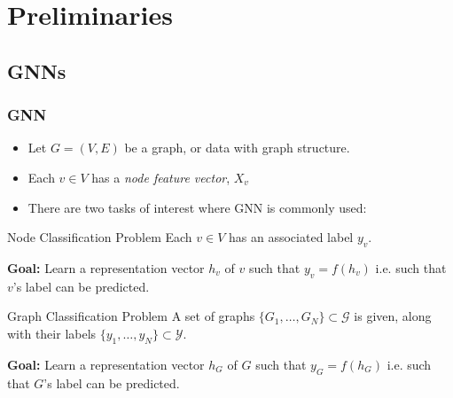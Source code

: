 \documentclass[handout]{beamer}
\begin{document}

\section{Preliminaries}


\subsection{GNNs}

\begin{frame}
\frametitle{GNN}

\begin{itemize}
	\item Let $G = (V, E)$ be a graph, or data with graph structure. \pause
	
	\item Each $v \in V$ has a {\it node feature vector}, $X_v$ \pause
	
	\item There are two tasks of interest where GNN is commonly used: \pause
\end{itemize}

\begin{block}{Node Classification Problem}
Each $v \in V$ has an associated label $y_v$.

{\bf Goal:} Learn a representation vector $h_v$ of $v$ such that $y_v = f(h_v)$ i.e. such that $v$'s label can be predicted. 
\end{block} \pause

\begin{block}{Graph Classification Problem}
A set of graphs $\{G_1, \dots, G_N\} \subset \mathcal{G}$ is given, along with their labels $\{y_1, \dots, y_N\} \subset \mathcal{Y}$.

{\bf Goal:} Learn a representation vector $h_G$ of $G$ such that $y_G = f(h_G)$ i.e. such that $G$'s label can be predicted. 
\end{block}

\end{frame}
\end{document}
